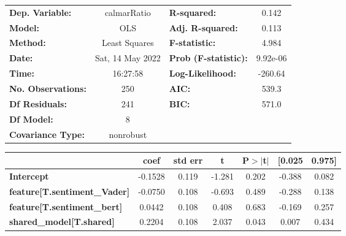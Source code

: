 \begin{center}
\begin{tabular}{lclc}
\toprule
\textbf{Dep. Variable:}                       &   calmarRatio    & \textbf{  R-squared:         } &     0.142   \\
\textbf{Model:}                               &       OLS        & \textbf{  Adj. R-squared:    } &     0.113   \\
\textbf{Method:}                              &  Least Squares   & \textbf{  F-statistic:       } &     4.984   \\
\textbf{Date:}                                & Sat, 14 May 2022 & \textbf{  Prob (F-statistic):} &  9.92e-06   \\
\textbf{Time:}                                &     16:27:58     & \textbf{  Log-Likelihood:    } &   -260.64   \\
\textbf{No. Observations:}                    &         250      & \textbf{  AIC:               } &     539.3   \\
\textbf{Df Residuals:}                        &         241      & \textbf{  BIC:               } &     571.0   \\
\textbf{Df Model:}                            &           8      & \textbf{                     } &             \\
\textbf{Covariance Type:}                     &    nonrobust     & \textbf{                     } &             \\
\bottomrule
\end{tabular}
\begin{tabular}{lcccccc}
                                              & \textbf{coef} & \textbf{std err} & \textbf{t} & \textbf{P$> |$t$|$} & \textbf{[0.025} & \textbf{0.975]}  \\
\midrule
\textbf{Intercept}                            &      -0.1528  &        0.119     &    -1.281  &         0.202        &       -0.388    &        0.082     \\
\textbf{feature[T.sentiment\_Vader]}          &      -0.0750  &        0.108     &    -0.693  &         0.489        &       -0.288    &        0.138     \\
\textbf{feature[T.sentiment\_bert]}           &       0.0442  &        0.108     &     0.408  &         0.683        &       -0.169    &        0.257     \\
\textbf{shared\_model[T.shared]}              &       0.2204  &        0.108     &     2.037  &         0.043        &        0.007    &        0.434     \\

\end{tabular}
\end{center}
